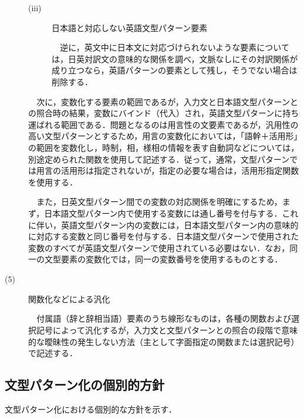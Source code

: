 \documentclass{nlp}
\begin{document}
\begin{description}
\begin{description}
\item[(iii)] 日本語と対応しない英語文型パターン要素 

\verb|  |逆に，英文中に日本文に対応づけられないような要素については，日英対訳文の意味的な関係を調べ，文脈なしにその対訳関係が成り立つなら，英語パターンの要素として残し，そうでない場合は削除する．
\end{description}

\verb|  |次に，変数化する要素の範囲であるが，入力文と日本語文型パターンとの照合時の結果，変数にバインド（代入）され，英語文型パターンに持ち運ばれる範囲である．問題となるのは用言性の文要素であるが，汎用性の高い文型パターンとするため，用言の変数化においては，「語幹＋活用形」の範囲を変数化し，時制，相，様相の情報を表す自動詞などについては，別途定められた関数を使用して記述する．従って，通常，文型パターンでは用言の活用形は指定されないが，指定の必要な場合は，活用形指定関数を使用する．

\verb|  |また，日英文型パターン間での変数の対応関係を明確にするため，まず，日本語文型パターン内で使用する変数には通し番号を付与する．これに伴い，英語文型パターン内の変数には，日本語文型パターン内の意味的に対応する変数と同じ番号を付与する．日本語文型パターンで使用された変数のすべてが英語文型パターンで使用されている必要はない．なお，同一の文型要素の変数化では，同一の変数番号を使用するものとする．
\item[(5)] 関数化などによる汎化 

\verb|  |付属語（辞と辞相当語）要素のうち線形なものは，各種の関数および選択記号によって汎化するが，入力文と文型パターンとの照合の段階で意味的な曖昧性の発生しない方法（主として字面指定の関数または選択記号）で記述する．
\end{description}

\subsection{文型パターン化の個別的方針}

文型パターン化における個別的な方針を示す．
\end{document}
